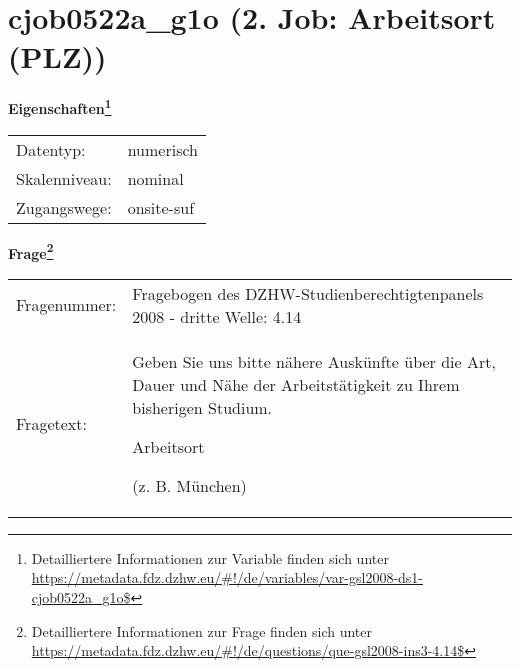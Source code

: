 
    \setcounter{footnote}{0}

    \vspace*{-1.8cm}
	\section{cjob0522a\_g1o (2. Job: Arbeitsort (PLZ))}
	\label{section:cjob0522a_g1o}



    \vspace*{0.5cm}
    \noindent\textbf{Eigenschaften\footnote{Detailliertere Informationen zur Variable finden sich unter
		\url{https://metadata.fdz.dzhw.eu/\#!/de/variables/var-gsl2008-ds1-cjob0522a_g1o$}}}\\
	\begin{tabularx}{\hsize}{@{}lX}
	Datentyp: & numerisch \\
	Skalenniveau: & nominal \\
	Zugangswege: &
	  onsite-suf
 \\
    \end{tabularx}



				\vspace*{0.5cm}
                \noindent\textbf{Frage\footnote{Detailliertere Informationen zur Frage finden sich unter
		              \url{https://metadata.fdz.dzhw.eu/\#!/de/questions/que-gsl2008-ins3-4.14$}}}\\
				\begin{tabularx}{\hsize}{@{}lX}
					Fragenummer: &
					  Fragebogen des DZHW-Studienberechtigtenpanels 2008 - dritte Welle:
					  4.14
 \\
					Fragetext: & Geben Sie uns bitte nähere Auskünfte über die Art, Dauer und Nähe der Arbeitstätigkeit zu Ihrem bisherigen Studium.\par  Arbeitsort\par  (z. B. München) \\
				\end{tabularx}





